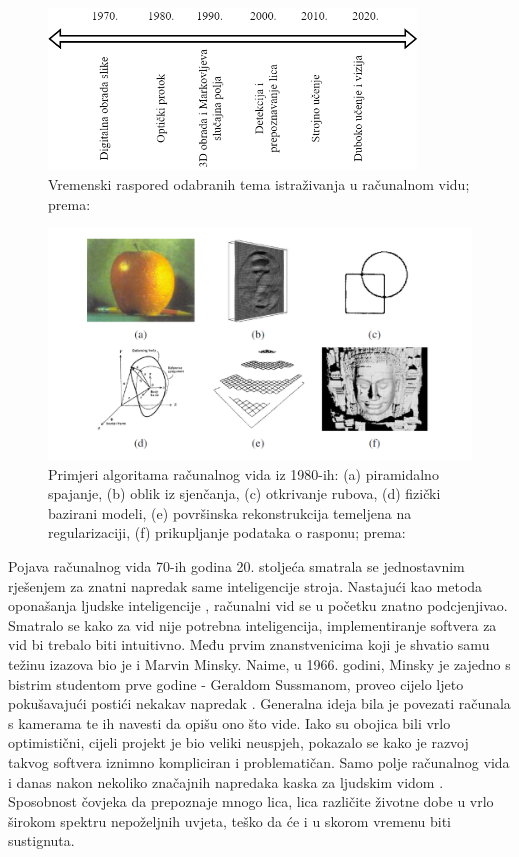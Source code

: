 \documentclass[]{foi} %
\begin{document}
\begin{figure}[!ht]
    \centering
    \includegraphics[width=0.87\textwidth]{slike/vremenskalinija.png}
    \caption{Vremenski raspored odabranih tema istraživanja u računalnom vidu; prema: \cite{szeliskicvaa}}
    \label{fig:vremlinija}
\end{figure}

\begin{figure}[!ht]
    \centering
    \includegraphics[width=1.1\textwidth]{slike/1980.png}
    \caption{Primjeri algoritama računalnog vida iz 1980-ih: (a) piramidalno spajanje, (b) oblik iz sjenčanja, (c) otkrivanje rubova, (d) fizički bazirani modeli, (e) površinska rekonstrukcija temeljena na regularizaciji, (f) prikupljanje podataka o rasponu; prema: \cite{szeliskicvaa}}
    \label{fig:1980ih}
\end{figure}

Pojava računalnog vida 70-ih godina 20. stoljeća \cite[str. 11]{szeliskicvaa} smatrala se jednostavnim rješenjem za znatni napredak same inteligencije stroja. Nastajući kao metoda oponašanja ljudske inteligencije \cite[str. 11]{szeliskicvaa}, računalni vid se u početku znatno podcjenjivao. Smatralo se kako za vid nije potrebna inteligencija, implementiranje softvera za vid bi trebalo biti intuitivno. Među prvim znanstvenicima koji je shvatio samu težinu izazova bio je i Marvin Minsky. Naime, u 1966. godini, Minsky je zajedno s bistrim studentom prve godine - Geraldom Sussmanom, proveo cijelo ljeto pokušavajući postići nekakav napredak \cite[str. 781]{minskySussman}. Generalna ideja bila je povezati računala s kamerama te ih navesti da opišu ono što vide. Iako su obojica bili vrlo optimistični, cijeli projekt je bio veliki neuspjeh, pokazalo se kako je razvoj takvog softvera iznimno kompliciran i problematičan. Samo polje računalnog vida i danas nakon nekoliko značajnih napredaka kaska za ljudskim vidom \cite{Huang1996ComputerVE}. Sposobnost čovjeka da prepoznaje mnogo lica, lica različite životne dobe u vrlo širokom spektru nepoželjnih uvjeta, teško da će i u skorom vremenu biti sustignuta.
\end{document}
